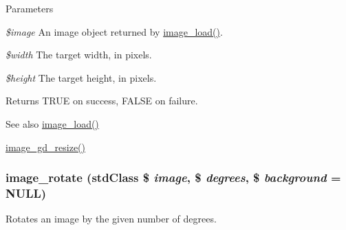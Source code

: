\begin{DoxyParams}{Parameters}
\item[{\em \$image}]An image object returned by \hyperlink{group__image_ga96098e5b039dc3906a656fa889a04776}{image\_\-load()}. \item[{\em \$width}]The target width, in pixels. \item[{\em \$height}]The target height, in pixels.\end{DoxyParams}
\begin{DoxyReturn}{Returns}
TRUE on success, FALSE on failure.
\end{DoxyReturn}
\begin{DoxySeeAlso}{See also}
\hyperlink{group__image_ga96098e5b039dc3906a656fa889a04776}{image\_\-load()} 

\hyperlink{group__image_ga8d0c1abb541e01ec7a76a57add14a0b2}{image\_\-gd\_\-resize()} 
\end{DoxySeeAlso}
\hypertarget{group__image_gaccf6671cd3ed866c6463ef6ae6436dc3}{
\subsubsection[{image\_\-rotate}]{\setlength{\rightskip}{0pt plus 5cm}image\_\-rotate (stdClass \$ {\em image}, \/  \$ {\em degrees}, \/  \$ {\em background} = {\ttfamily NULL})}}
\label{group__image_gaccf6671cd3ed866c6463ef6ae6436dc3}
Rotates an image by the given number of degrees.


